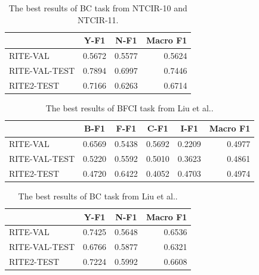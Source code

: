 \documentclass[12pt]{article}
\begin{document}
\begin{CJK*}{UTF8}{bkai}
\begin{spacing}{1.77}
\begin{table}[H]
  \centering
  \setlength{\extrarowheight}{-3pt}
  \begin{tabular}{|l|r|r|r|}
  \hline
   & \multicolumn{1}{c|}{Y-F1} & \multicolumn{1}{c|}{N-F1} & \multicolumn{1}{c|}{Macro F1} \\ \hline
  RITE-VAL & 0.5672 & 0.5577 & 0.5624 \\ \hline
  RITE-VAL-TEST & 0.7894 & 0.6997 & 0.7446 \\ \hline
  RITE2-TEST & 0.7166 & 0.6263 & 0.6714 \\ \hline
  \end{tabular}
  \caption{The best results of BC task from NTCIR-10 and NTCIR-11.}
  \label{result:bc_ntcir}
\end{table}

\begin{table}[H]
  \centering
  \setlength{\extrarowheight}{-3pt}
  \begin{tabular}{|l|r|r|r|r|r|}
  \hline
   & \multicolumn{1}{c|}{B-F1} & \multicolumn{1}{c|}{F-F1} & \multicolumn{1}{c|}{C-F1} & \multicolumn{1}{c|}{I-F1} & \multicolumn{1}{c|}{Macro F1} \\ \hline
  RITE-VAL & 0.6569 & 0.5438 & 0.5692 & 0.2209 & 0.4977 \\ \hline
  RITE-VAL-TEST & 0.5220 & 0.5592 & 0.5010 & 0.3623 & 0.4861 \\ \hline
  RITE2-TEST & 0.4720 & 0.6422 & 0.4052 & 0.4703 & 0.4974 \\ \hline
  \end{tabular}
  \caption{The best results of BFCI task from Liu et al.\cite{liu_2016_paper}.}
  \label{result:bfci_liu_2016}
\end{table}

\begin{table}[H]
  \centering
  \setlength{\extrarowheight}{-3pt}
  \begin{tabular}{|l|r|r|r|}
  \hline
   & \multicolumn{1}{c|}{Y-F1} & \multicolumn{1}{c|}{N-F1} & \multicolumn{1}{c|}{Macro F1} \\ \hline
  RITE-VAL & 0.7425 & 0.5648 & 0.6536 \\ \hline
  RITE-VAL-TEST & 0.6766 & 0.5877 & 0.6321 \\ \hline
  RITE2-TEST & 0.7224 & 0.5992 & 0.6608 \\ \hline
  \end{tabular}
  \caption{The best results of BC task from Liu et al.\cite{liu_2016_paper}.}
  \label{result:bc_liu_2016}
\end{table}


\end{spacing}
\end{CJK*}
\end{document}
